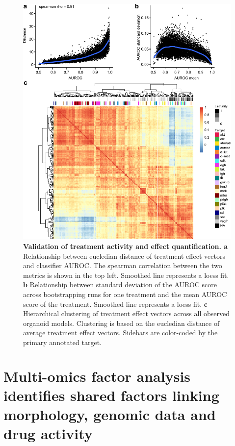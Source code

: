 \begin{flushleft}
\begin{figure}[h!]
\centering
\includegraphics[width=\textwidth,
                height=\textheight,
                keepaspectratio]{figures/promise/pdf/fig_3_2.pdf}
\caption{\textbf{Validation of treatment activity and effect quantification. a} Relationship between eucledian distance of treatment effect vectors and classifier AUROC. The spearman correlation between the two metrics is shown in the top left. Smoothed line represents a loess fit. \textbf{b} Relationship between standard deviation of the AUROC score across bootstrapping runs for one treatment and the mean AUROC score of the treatment. Smoothed line represents a loess fit. \textbf{c} Hierarchical clustering of treatment effect vectors across all observed organoid models. Clustering is based on the eucledian distance of average treatment effect vectors. Sidebars are color-coded by the primary annotated target.}
\label{fig_232}
\end{figure}
\bigbreak


\newpage

\section{Multi-omics factor analysis identifies shared factors linking morphology, genomic data and drug activity}


\end{flushleft}
